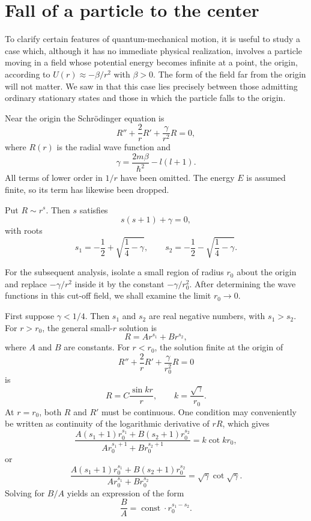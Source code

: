\section{Fall of a particle to the center}

To clarify certain features of quantum-mechanical motion, it is useful to
study a case which, although it has no immediate physical realization,
involves a particle moving in a field whose potential energy becomes infinite
at a point, the origin, according to $U(r)\approx-\beta/r^2$ with $\beta>0$.
The form of the field far from the origin will not matter. We saw in 
that this case lies precisely between those admitting ordinary stationary
states and those in which the particle falls to the origin.

Near the origin the Schrödinger equation is
\begin{equation}
  R''+\frac2rR'+\frac\gamma{r^2}R=0,
  \tag{35.1}
\end{equation}
where $R(r)$ is the radial wave function and
\begin{equation}
  \gamma=\frac{2m\beta}{\hbar^2}-l(l+1).
  \tag{35.2}
\end{equation}
All terms of lower order in $1/r$ have been omitted. The energy $E$ is
assumed finite, so its term has likewise been dropped.

Put $R\sim r^s$. Then $s$ satisfies
\[
  s(s+1)+\gamma=0,
\]
with roots
\begin{equation}
  s_1=-\frac12+\sqrt{\frac14-\gamma},\qquad
  s_2=-\frac12-\sqrt{\frac14-\gamma}.
  \tag{35.3}
\end{equation}

For the subsequent analysis, isolate a small region of radius $r_0$ about the
origin and replace $-\gamma/r^2$ inside it by the constant
$-\gamma/r_0^2$. After determining the wave functions in this cut-off field,
we shall examine the limit $r_0\to0$.

First suppose $\gamma<1/4$. Then $s_1$ and $s_2$ are real negative numbers,
with $s_1>s_2$. For $r>r_0$, the general small-$r$ solution is
\begin{equation}
  R=Ar^{s_1}+Br^{s_2},
  \tag{35.4}
\end{equation}
where $A$ and $B$ are constants. For $r<r_0$, the solution finite at the
origin of
\[
  R''+\frac2rR'+\frac\gamma{r_0^2}R=0
\]
is
\begin{equation}
  R=C\frac{\sin kr}{r},\qquad k=\frac{\sqrt\gamma}{r_0}.
  \tag{35.5}
\end{equation}
At $r=r_0$, both $R$ and $R'$ must be continuous. One condition may
conveniently be written as continuity of the logarithmic derivative of $rR$,
which gives
\[
  \frac{A(s_1+1)r_0^{s_1}+B(s_2+1)r_0^{s_2}}
       {Ar_0^{s_1+1}+Br_0^{s_2+1}}=k\cot kr_0,
\]
or
\[
  \frac{A(s_1+1)r_0^{s_1}+B(s_2+1)r_0^{s_2}}
       {Ar_0^{s_1}+Br_0^{s_2}}
  =\sqrt\gamma\cot\sqrt\gamma.
\]
Solving for $B/A$ yields an expression of the form
\begin{equation}
  \frac BA=\operatorname{const}\cdot r_0^{s_1-s_2}.
  \tag{35.6}
\end{equation}


